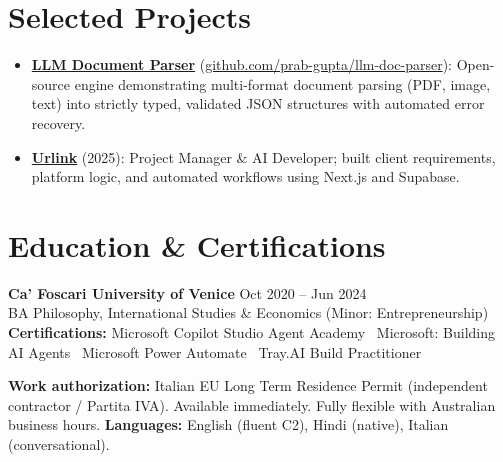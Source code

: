 \documentclass[a4paper,10pt]{article}
\begin{document}
\section{Selected Projects}
\begin{itemize}
  \item \textbf{\href{https://github.com/prab-gupta/llm-doc-parser}{LLM Document Parser}} (\href{https://github.com/prab-gupta/llm-doc-parser}{github.com/prab-gupta/llm-doc-parser}): Open-source engine demonstrating multi-format document parsing (PDF, image, text) into strictly typed, validated JSON structures with automated error recovery.
  \item \textbf{\href{https://smarturlink.com/}{Urlink}} (2025): Project Manager \& AI Developer; built client requirements, platform logic, and automated workflows using Next.js and Supabase.
\end{itemize}

\section{Education \& Certifications}
\textbf{Ca' Foscari University of Venice} \hfill Oct 2020 -- Jun 2024\\
BA Philosophy, International Studies \& Economics (Minor: Entrepreneurship)\\[1pt]
\textbf{Certifications:} Microsoft Copilot Studio Agent Academy \textbullet\ Microsoft: Building AI Agents \textbullet\ Microsoft Power Automate \textbullet\ Tray.AI Build Practitioner

\vspace{2pt}
{\small \textbf{Work authorization:} Italian EU Long Term Residence Permit (independent contractor / Partita IVA). Available immediately. Fully flexible with Australian business hours. \quad \textbf{Languages:} English (fluent C2), Hindi (native), Italian (conversational).}
\end{document}
